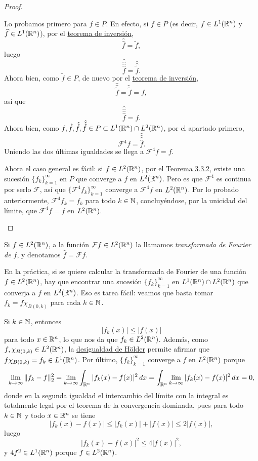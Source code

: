 \documentclass[a4paper, 11pt, oneside]{report}
\begin{document}
\begin{proof}
\begin{enumerate}
    Lo probamos primero para $f \in P$. En efecto, si $f \in P$ (es decir, $f \in L^1(\mathbb R^n)$ y $\widehat{f} \in L^1(\mathbb R^n)$), por el \hyperref[teo:3.2.3]{\color{c1}teorema de inversión},
    \[\hat{\hat{f}} = \widetilde{f},\]
    luego
    \[\hat{\hat{\hat{\hat{f}}}} = \hat{\hat{\tilde{f}}}.\]
    Ahora bien, como $\widetilde{f} \in P$, de nuevo por el \hyperref[teo:3.2.3]{\color{c1}teorema de inversión},
    \[\hat{\hat{\tilde{f}}} = \tilde{\tilde{f}} = f,\]
    así que
    \[\hat{\hat{\hat{\hat{f}}}} = f.\]
    Ahora bien, como $f,\hat{f},\hat{\hat{f}},\hat{\hat{\hat{f}}} \in P \subset L^1(\mathbb R^n) \cap L^2(\mathbb R^n)$, por el apartado primero,
    \[\mathcal{F}^4f = \hat{\hat{\hat{\hat{f}}}}.\]
    Uniendo las dos últimas igualdades se llega a $\mathcal{F}^4f = f$.

    Ahora el caso general es fácil: si $f \in L^2(\mathbb R^n)$, por el \hyperref[teo:3.3.2]{\color{c1}Teorema 3.3.2}, existe una sucesión $\{f_k\}_{k=1}^\infty$ en $P$ que converge a $f$ en $L^2(\mathbb R^n)$. Pero es que $\mathcal{F}^4$ es continua por serlo $\mathcal{F}$, así que $\{\mathcal{F}^4f_k\}_{k=1}^\infty$ converge a $\mathcal{F}^4f$ en $L^2(\mathbb R^n)$. Por lo probado anteriormente, $\mathcal{F}^4f_k = f_k$ para todo $k \in \mathbb N$, concluyéndose, por la unicidad del límite, que $\mathcal{F}^4f = f$ en $L^2(\mathbb R^n)$. \qedhere
  \end{enumerate}
\end{proof}

\begin{definition}
  Si $f \in L^2(\mathbb R^n)$, a la función $\mathcal{F}f \in L^2(\mathbb R^n)$ la llamamos \emph{transformada de Fourier de $f$}, y denotamos $\widehat{f} = \mathcal{F}f$.
\end{definition}

En la práctica, si se quiere calcular la transformada de Fourier de una función $f \in L^2(\mathbb R^n)$, hay que encontrar una sucesión $\{f_k\}_{k=1}^\infty$ en $L ^1(\mathbb R^n) \cap L^2(\mathbb R^n)$ que converja a $f$ en $L^2(\mathbb R^n)$. Eso es tarea fácil: veamos que basta tomar $f_k = f\chi_{B(0,k)}$ para cada $k \in \mathbb N$. 

Si $k \in \mathbb N$, entonces
\[|f_k(x)| \leq |f(x)|\]
para todo $x \in \mathbb R^n$, lo que nos da que $f_k \in L^2(\mathbb R^n)$. Además, como $f,\chi_{B(0,k)} \in L^2(\mathbb R^n)$, la \hyperref[cor:1.4.4]{\color{c1}desigualdad de Hölder} permite afirmar que $f\chi_{B(0,k)} = f_k \in L^1(\mathbb R^n)$. Por último, $\{f_k\}_{k=1}^\infty$ converge a $f$ en $L ^2(\mathbb R^n)$ porque
\[\lim_{k \to \infty} \|f_k - f\|_2^2 =\lim_{k \to \infty}\int_{\mathbb R^n} |f_k(x)-f(x)|^2 \, dx = \int_{\mathbb R^n} \lim_{k \to \infty} |f_k(x) - f(x)|^2 \, dx = 0,\]
donde en la segunda igualdad el intercambio del límite con la integral es totalmente legal por el teorema de la convergencia dominada, pues para todo $k \in \mathbb N$ y todo $x \in \mathbb R^n$ se tiene
\[|f_k(x)- f(x)| \leq |f_k(x)| + |f(x)| \leq 2|f(x)|,\]
luego
\[|f_k(x)- f(x)|^2 \leq 4|f(x)|^2,\]
y $4f^2 \in L^1(\mathbb R^n)$ porque $f \in L^2(\mathbb R^n)$. 
\end{document}
